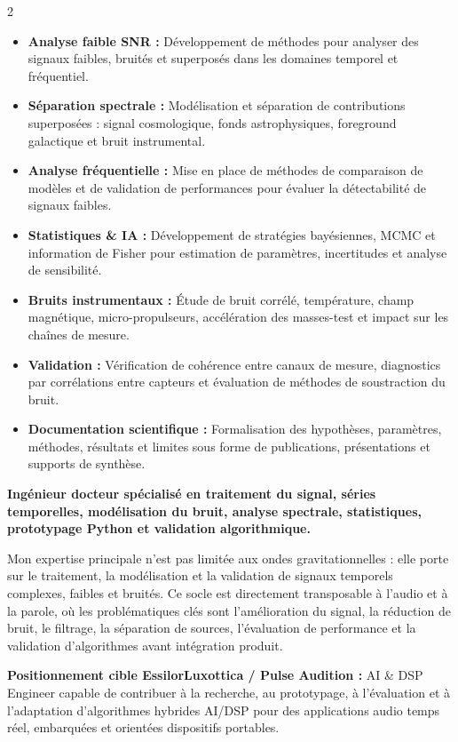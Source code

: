 \documentclass[8pt,a4paper,ragged2e,withhyper]{../_shared/altacv}
\begin{document}
\begin{paracol}{2}
\begin{itemize}
  \item \textbf{Analyse faible SNR :} Développement de méthodes pour analyser des signaux faibles, bruités et superposés dans les domaines temporel et fréquentiel.
  \item \textbf{Séparation spectrale :} Modélisation et séparation de contributions superposées : signal cosmologique, fonds astrophysiques, foreground galactique et bruit instrumental.
  \item \textbf{Analyse fréquentielle :} Mise en place de méthodes de comparaison de modèles et de validation de performances pour évaluer la détectabilité de signaux faibles.
  \item \textbf{Statistiques \& IA :} Développement de stratégies bayésiennes, MCMC et information de Fisher pour estimation de paramètres, incertitudes et analyse de sensibilité.
  \item \textbf{Bruits instrumentaux :} Étude de bruit corrélé, température, champ magnétique, micro-propulseurs, accélération des masses-test et impact sur les chaînes de mesure.
  \item \textbf{Validation :} Vérification de cohérence entre canaux de mesure, diagnostics par corrélations entre capteurs et évaluation de méthodes de soustraction du bruit.
  \item \textbf{Documentation scientifique :} Formalisation des hypothèses, paramètres, méthodes, résultats et limites sous forme de publications, présentations et supports de synthèse.
\end{itemize}

\switchcolumn


\textbf{Ingénieur docteur spécialisé en traitement du signal, séries temporelles, modélisation du bruit, analyse spectrale, statistiques, prototypage Python et validation algorithmique.}

Mon expertise principale n’est pas limitée aux ondes gravitationnelles : elle porte sur le traitement, la modélisation et la validation de signaux temporels complexes, faibles et bruités. Ce socle est directement transposable à l’audio et à la parole, où les problématiques clés sont l’amélioration du signal, la réduction de bruit, le filtrage, la séparation de sources, l’évaluation de performance et la validation d’algorithmes avant intégration produit.

\medskip

\textbf{Positionnement cible EssilorLuxottica / Pulse Audition :} AI \& DSP Engineer capable de contribuer à la recherche, au prototypage, à l’évaluation et à l’adaptation d’algorithmes hybrides AI/DSP pour des applications audio temps réel, embarquées et orientées dispositifs portables.


\end{paracol}
\end{document}

